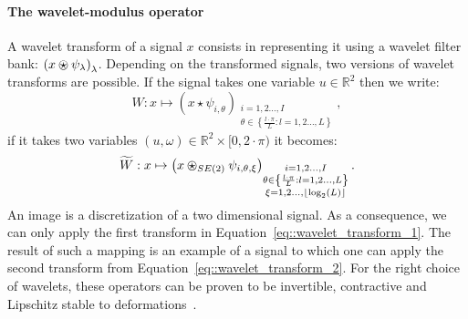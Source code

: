            \paragraph{The wavelet-modulus operator}
                A wavelet transform of a signal $x$ consists in representing it using a wavelet filter bank: $\left(x\ostar\psi_{\lambda}\right)_{\lambda}$.
                Depending on the transformed signals, two versions of wavelet transforms are possible.
                If the signal takes one variable $u \in \mathbb{R}^2$ then we write:
                \begin{equation}
                    \label{eq::wavelet_transform_1}
                    W: x \mapsto \left(x\star\psi_{i, \theta}\right)_{\substack{i=1, 2 \dots, I \\ \theta \in \left\{\frac{l\cdot\pi}{L}: l=1,2\dots,L\right\}}},
                \end{equation}
                if it takes two variables $(u, \omega) \in \mathbb{R}^2 \times [0, 2\cdot\pi)$ it becomes:
                \begin{equation}
                    \label{eq::wavelet_transform_2}
                    \widetilde{W}: x \mapsto \left(x\ostar_{SE(2)}\psi_{i, \theta, \xi}\right)_{\substack{i=1, 2 \dots, I \\ \theta \in \left\{\frac{l\cdot\pi}{L}: l=1,2\dots,L\right\}\\\xi=1,2\dots,\lfloor\log_2(L)\rfloor}}.
                \end{equation}
                An image is a discretization of a two dimensional signal.
                As a consequence, we can only apply the first transform in Equation~\ref{eq::wavelet_transform_1}.
                The result of such a mapping is an example of a signal to which one can apply the second transform from Equation~\ref{eq::wavelet_transform_2}.
                For the right choice of wavelets, these operators can be proven to be invertible, contractive and Lipschitz stable to deformations~\parencite{mallat2012group}.\\

